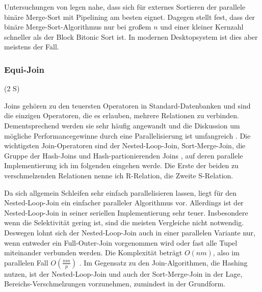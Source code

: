 \documentclass[a4paper,12pt,twoside]{article}
\begin{document}
{Untersuchungen von {\textcite{Bitton1984}} legen nahe, dass sich für externes Sortieren der parallele binäre Merge-Sort mit Pipelining am besten eignet. Dagegen stellt {\textcite{Menon1986}} fest, dass der binäre Merge-Sort-Algorithmus nur bei großem $n$ und einer kleiner Kernzahl schneller als der Block Bitonic Sort ist. In modernen Desktopsystem ist dies aber meistens der Fall.

\subsubsection{Equi-Join} (2 S)
\label{Equi Join} 

Joins gehören zu den teuersten Operatoren in Standard-Datenbanken und sind die einzigen Operatoren, die es erlauben, mehrere Relationen zu verbinden. Dementsprechend werden sie sehr häufig angewandt und die Diskussion um mögliche Performancegewinne durch eine Parallelisierung ist umfangreich \parencite{Richardson1987, Valduriez1984, Schneider1989, DeWitt1985, Lu1994}. Die wichtigsten Join-Operatoren sind der Nested-Loop-Join, Sort-Merge-Join, die Gruppe der Hash-Joins und Hash-partionierenden Joins \parencite{Mishra1992, Lu1994}, auf deren parallele Implementierung ich im folgenden eingehen werde. Die Erste der beiden zu verschmelzenden Relationen nenne ich R-Relation, die Zweite S-Relation.

Da sich allgemein Schleifen sehr einfach parallelisieren lassen, liegt für den Nested-Loop-Join ein einfacher paralleler Algorithmus vor. Allerdings ist der Nested-Loop-Join in seiner seriellen Implementierung sehr teuer. Insbesondere wenn die Selektivität gering ist, sind die meisten Vergleiche nicht notwendig. Deswegen lohnt sich der Nested-Loop-Join auch in einer parallelen Variante nur, wenn entweder ein Full-Outer-Join vorgenommen wird oder fast alle Tupel miteinander verbunden werden. Die Komplexität beträgt $ O(n m) $, also im parallelen Fall $ O( \frac {n m} {p} )$ \parencite[S. 72]{Mishra1992}. Im Gegensatz zu den Join-Algorithmen, die Hashing nutzen, ist der Nested-Loop-Join und auch der Sort-Merge-Join in der Lage, Bereichs-Verschmelzungen vorzunehmen, zumindest in der Grundform. 

}
\end{document}
